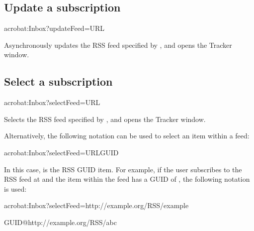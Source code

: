 \documentclass[letterpaper,12pt,english,openany,oneside]{sphinxmanual}
\begin{document}
\subsection{Update a subscription}
\label{\detokenize{Tracker_InboxAPI:update-a-subscription}}
\begin{sphinxVerbatim}[commandchars=\\\{\}]
acrobat:Inbox?updateFeed=\PYGZlt{}URL\PYGZgt{}
\end{sphinxVerbatim}

Asynchronously updates the RSS feed specified by , and opens the Tracker window.




\subsection{Select a subscription}
\label{\detokenize{Tracker_InboxAPI:select-a-subscription}}
\begin{sphinxVerbatim}[commandchars=\\\{\}]
acrobat:Inbox?selectFeed=\PYGZlt{}URL\PYGZgt{}
\end{sphinxVerbatim}

Selects the RSS feed specified by , and opens the Tracker window.

Alternatively, the following notation can be used to select an item within a feed:

\begin{sphinxVerbatim}[commandchars=\\\{\}]
acrobat:Inbox?selectFeed=\PYGZlt{}URL\PYGZgt{}\PYGZsh{}\PYGZlt{}GUID\PYGZgt{}
\end{sphinxVerbatim}

In this case,  is the RSS GUID item. For example, if the user subscribes to the RSS feed at  and the item within the feed has a GUID of , the following notation is used:

\begin{sphinxVerbatim}[commandchars=\\\{\}]
acrobat:Inbox?selectFeed=\PYGZlt{}http://example.org/RSS/example\PYGZgt{}\PYGZsh{}

  \PYGZlt{}GUID\PYGZgt{}@\PYGZlt{}http://example.org/RSS/abc\PYGZgt{}
\end{sphinxVerbatim}
\end{document}

